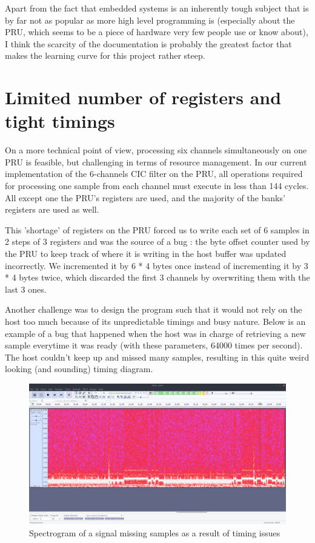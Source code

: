 \documentclass[]{report}
\begin{document}
Apart from the fact that embedded systems is an inherently tough subject that is by far not as popular as more high level programming is (especially about the PRU, which seems to be a piece of hardware very few people use or know about), I think the scarcity of the documentation is probably the greatest factor that makes the learning curve for this project rather steep.

\hypertarget{limited-number-of-registers-and-tight-timings}{%
\section{Limited number of registers and tight
timings}\label{limited-number-of-registers-and-tight-timings}}

On a more technical point of view, processing six channels simultaneously on one PRU is feasible, but challenging in terms of resource management. In our current implementation of the 6-channels CIC filter on the PRU, all operations required for processing one sample from each channel must execute in less than 144 cycles. All except one the PRU's registers are used, and the majority of the banks' registers are used as well.

This 'shortage' of registers on the PRU forced us to write each set of 6 samples in 2 steps of 3 registers and was the source of a bug : the byte offset counter used by the PRU to keep track of where it is writing in the host buffer was updated incorrectly. We incremented it by 6 * 4 bytes once instead of incrementing it by 3 * 4 bytes twice, which discarded the first 3 channels by overwriting them with the last 3 ones.

Another challenge was to design the program such that it would not rely on the host too much because of its unpredictable timings and busy nature. Below is an example of a bug that happened when the host was in charge of retrieving a new sample everytime it was ready (with these parameters, 64000 times per second). The host couldn't keep up and missed many samples, resulting in this quite weird looking (and sounding) timing diagram.

\begin{figure}[h]
\centering
\includegraphics[width=1.0\linewidth]{Pictures/timing_bug.png}
\caption{Spectrogram of a signal missing samples as a result of timing
issues}
\end{figure}
\end{document}
